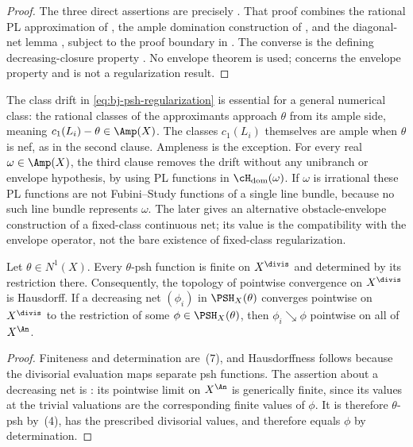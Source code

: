 \begin{proof}
The three direct assertions are precisely
\cite[Theorem~4.15\,(i)--(iii)]{BJ22}.  That proof combines the rational PL
approximation of \cite[Lemma~3.7]{BJ22}, the ample domination construction
of \cite[Proposition~3.10]{BJ22}, and the diagonal-net lemma
\cite[Lemma~4.6]{BJ22}, subject to the proof boundary in
.  The converse is the defining decreasing-closure
property \cite[Definition~4.1 and Theorem~4.5]{BJ22}.  No envelope theorem
is used; \cite[Theorem~5.20]{BJ22} concerns the envelope property and is not
a regularization result.
\end{proof}

The class drift in \eqref{eq:bj-psh-regularization} is essential for a
general numerical class: the rational classes of the approximants
approach $\theta$ from its ample side, meaning
$c_1(L_i)-\theta\in\Amp(X)$.  The classes $c_1(L_i)$ themselves are
ample when $\theta$ is nef, as in the second clause.  Ampleness is the exception.  For every real
$\omega\in\Amp(X)$, the third clause removes the drift without any
unibranch or envelope hypothesis, by using PL functions in
$\cH_{\mathrm{dom}}(\omega)$.  If $\omega$ is irrational these PL
functions are not Fubini--Study functions of a single line bundle, because
no such line bundle represents $\omega$.  The later
 gives an alternative
obstacle-envelope construction of a fixed-class continuous net; its value
is the compatibility with the envelope operator, not the bare existence of
fixed-class regularization.

\begin{theorem}
\label{thm:ch34-psh-compactness}
Let $\theta\in N^1(X)$.  Every $\theta$-psh function is finite on
$X^{\divis}$ and determined by its restriction there.  Consequently, the
topology of pointwise convergence on $X^{\divis}$ is Hausdorff.  If a
decreasing net $(\phi_i)$ in $\PSH_X(\theta)$ converges pointwise on
$X^{\divis}$ to the restriction of some
$\phi\in\PSH_X(\theta)$, then $\phi_i\searrow\phi$ pointwise on all of
$X^{\An}$.
\end{theorem}

\begin{proof}
Finiteness and determination are
\,(7), and Hausdorffness follows because the
divisorial evaluation maps separate psh functions.  The assertion about a
decreasing net is \cite[Corollary~4.25]{BJ22}: its pointwise limit on
$X^{\An}$ is generically finite, since its values at the trivial
valuations are the corresponding finite values of $\phi$.  It is therefore
$\theta$-psh by
\,(4), has the prescribed divisorial values, and
therefore equals $\phi$ by determination.
\end{proof}


